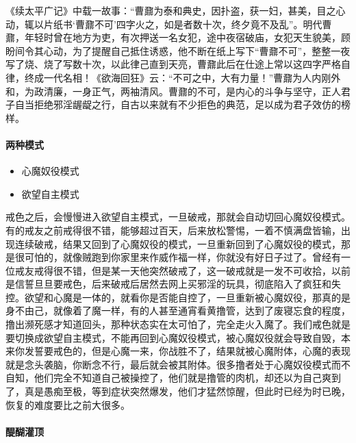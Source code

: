 《续太平广记》中载一故事：“曹鼐为泰和典史，因扑盗，获一妇，甚美，目之心动，辄以片纸书‘曹鼐不可’四字火之，如是者数十次，终夕竟不及乱”。明代曹鼐，年轻时曾在地方为吏，有次押送一名女犯，途中夜宿破庙，女犯天生貌美，顾盼间令其心动，为了提醒自己抵住诱惑，他不断在纸上写下“曹鼐不可”，整整一夜写了烧、烧了写数十次，以此律己直到天亮，曹鼐此后在仕途上常以这四字严格自律，终成一代名相！《欲海回狂》云：“不可之中，大有力量！”曹鼐为人内刚外和，为政清廉，一身正气，两袖清风。曹鼐的不可，是内心的斗争与坚守，正人君子自当拒绝邪淫龌龊之行，自古以来就有不少拒色的典范，足以成为君子效仿的榜样。

\paragraph{两种模式}

\begin{itemize}
    \item 心魔奴役模式
    \item 欲望自主模式
\end{itemize}

戒色之后，会慢慢进入欲望自主模式，一旦破戒，那就会自动切回心魔奴役模式。有的戒友之前戒得很不错，能够超过百天，后来放松警惕，一着不慎满盘皆输，出现连续破戒，结果又回到了心魔奴役的模式，一旦重新回到了心魔奴役的模式，那是很可怕的，就像贼跑到你家里来作威作福一样，你就没有好日子过了。曾经有一位戒友戒得很不错，但是某一天他突然破戒了，这一破戒就是一发不可收拾，以前是信誓旦旦要戒色，后来破戒后居然去网上买邪淫的玩具，彻底陷入了疯狂和失控。欲望和心魔是一体的，就看你是否能自控了，一旦重新被心魔奴役，那真的是身不由己，就像着了魔一样，有的人甚至通宵看黄撸管，达到了废寝忘食的程度，撸出濒死感才知道回头，那种状态实在太可怕了，完全走火入魔了。我们戒色就是要切换成欲望自主模式，不能再回到心魔奴役模式，被心魔奴役就会导致自毁，本来你发誓要戒色的，但是心魔一来，你战胜不了，结果就被心魔附体，心魔的表现就是念头袭脑，你断念不行，最后就会被其附体。很多撸者处于心魔奴役模式而不自知，他们完全不知道自己被操控了，他们就是撸管的肉机，却还以为自己爽到了，真是愚痴至极，等到症状突然爆发，他们才猛然惊醒，但此时已经为时已晚，恢复的难度要比之前大很多。

\paragraph{醍醐灌顶}

